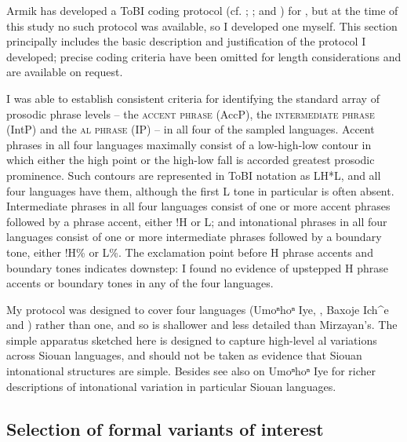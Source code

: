\documentclass[output=paper]{LSP/langsci}
\begin{document}
Armik \citet{Mirzayan2011} has developed a ToBI coding protocol (cf. \citealt{Pierrehumbert1980}; \citealt{BeckmanPierrehumbert1986}; and \citealt{PierrehumbertHirschberg1990}) for , but at the time of this study no such protocol was available, so I developed one myself. This section principally includes the basic description and justification of the protocol I developed; precise coding criteria have been omitted for length considerations and are available on request. 

I was able to establish consistent criteria for identifying the standard array of prosodic phrase levels -- the \textsc{accent phrase} (AccP), the \textsc{intermediate phrase} (IntP) and the \textsc{al phrase} (IP) -- in all four of the sampled languages. Accent phrases in all four languages maximally consist of a low-high-low contour in which either the high point or the high-low fall is accorded greatest prosodic prominence. Such contours are represented in ToBI notation as LH*L, and all four languages have them, although the first L tone in particular is often absent. Intermediate phrases in all four languages consist of one or more accent phrases followed by a phrase accent, either !H or L; and intonational phrases in all four languages consist of one or more intermediate phrases followed by a boundary tone, either !H\% or L\%. The exclamation point before H phrase accents and boundary tones indicates downstep: I found no evidence of upstepped H phrase accents or boundary tones in any of the four languages. 

My protocol was designed to cover four languages (Umoⁿhoⁿ Iye, , Baxoje Ich\^{}e and ) rather than one, and so is shallower and less detailed than Mirzayan’s. The simple apparatus sketched here is designed to capture high-level al variations across Siouan languages, and should not be taken as evidence that Siouan intonational structures are simple. Besides \citet{Mirzayan2011} see also \citet{Larson2009} on Umoⁿhoⁿ Iye for richer descriptions of intonational variation in particular Siouan languages. 

\subsection{Selection of formal variants of interest}\label{variantselection}
\end{document}
